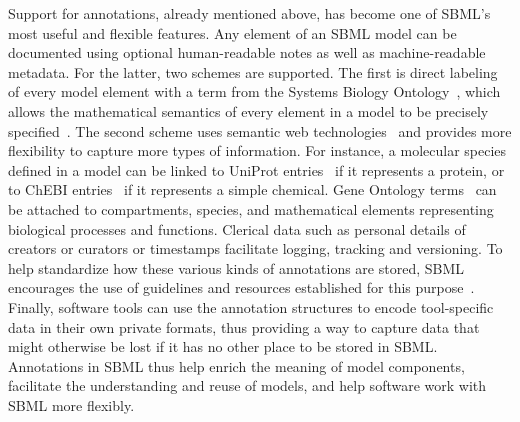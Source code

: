 \documentclass[]{draft-sbml-paper}
\begin{document}
Support for annotations, already mentioned above, has become one of SBML's most useful and flexible features.  Any element of an SBML model can be documented using optional human-readable notes as well as machine-readable metadata.  For the latter, two schemes are supported.  The first is direct labeling of every model element with a term from the Systems Biology Ontology~\citep{courtot2011controlled}, which allows the mathematical semantics of every element in a model to be precisely specified~\citep{LeNovere2006model}.  The second scheme uses semantic web technologies~\citep{lassila_resource_1999} and provides more flexibility to capture more types of information.  For instance, a molecular species defined in a model can be linked to UniProt entries~\citep{uniprot2017} if it represents a protein, or to ChEBI entries~\citep{hastings2013chebi} if it represents a simple chemical.  Gene Ontology terms~\citep{ashburner2000gene} can be attached to compartments, species, and mathematical elements representing biological processes and functions. Clerical data such as personal details of creators or curators or timestamps facilitate logging, tracking and versioning.  To help standardize how these various kinds of annotations are stored, SBML encourages the use of guidelines and resources established for this purpose~\citep{le_novere_2005, Laibe2007miriam}.  Finally, software tools can use the annotation structures to encode tool-specific data in their own private formats, thus providing a way to capture data that might otherwise be lost if it has no other place to be stored in SBML.  Annotations in SBML thus help enrich the meaning of model components, facilitate the understanding and reuse of models, and help software work with SBML more flexibly.
\end{document}
